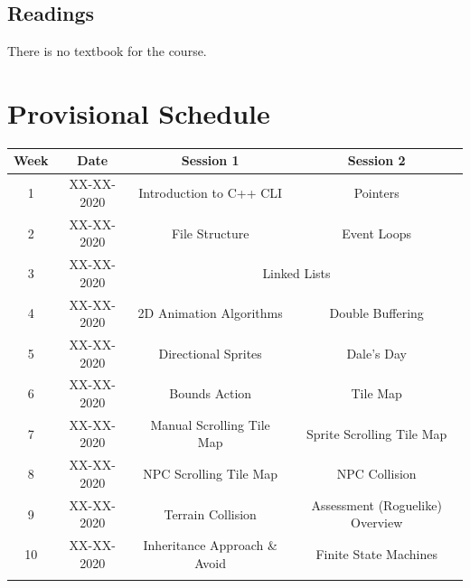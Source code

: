 \documentclass{article}
\begin{document}
\subsection*{Readings}
There is no textbook for the course.

\section*{Provisional Schedule}

\renewcommand{\arraystretch}{1.5}
\begin{tabular}{|c|c|c|c|}
  \hline
  \textbf{Week} & \textbf{Date} & \textbf{Session 1}                    & \textbf{Session 2}                         \\ \hline
  1             & XX-XX-2020    & Introduction to C++ CLI               & Pointers                                   \\ \hline
  2             & XX-XX-2020    & File Structure                        & Event Loops                                \\ \hline
  3             & XX-XX-2020    & \multicolumn{2}{c|}{Linked Lists}                                                  \\ \hline
  4             & XX-XX-2020    & 2D Animation Algorithms               & Double Buffering                           \\ \hline
  5             & XX-XX-2020    & Directional Sprites                   & \cellcolor{yellow} Dale's Day              \\ \hline
  6             & XX-XX-2020    & Bounds Action                         & Tile Map                                   \\ \hline
  7             & XX-XX-2020    & Manual Scrolling Tile Map             & Sprite Scrolling Tile Map                  \\ \hline
  8             & XX-XX-2020    & NPC Scrolling Tile Map                & NPC Collision                              \\ \hline
  9             & XX-XX-2020    & Terrain Collision                     & Assessment (Roguelike) Overview            \\ \hline
  10            & XX-XX-2020    & Inheritance Approach \& Avoid         & Finite State Machines                      \\ \hline
  \rowcolor{yellow} \multicolumn{4}{|c|}{Mid Term Break}                                                             \\ \hline

\end{tabular}
\end{document}
